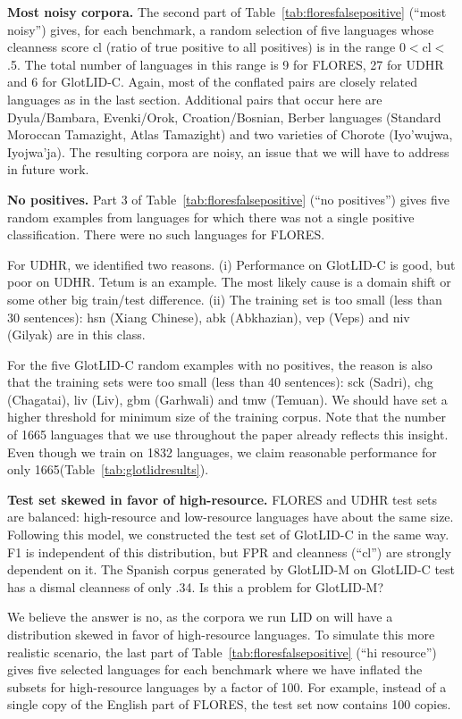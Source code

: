 \documentclass[11pt]{article}
\def\numberlanguagesaccurate{1665\xspace}
\def\numberlanguagestotal{1832\xspace}
\def\modelname{\mbox{GlotLID-M}\xspace}
\def\corpusname{\mbox{GlotLID-C}\xspace}
\def\flores{FLORES\xspace}
\def\udhr{UDHR\xspace}
\def\tabref#1{Table~\ref{tab:#1}}
\begin{document}
\textbf{Most noisy corpora.}
The second part of 
\tabref{floresfalsepositive} (``most noisy'') gives,
for each benchmark, a random selection of five languages
whose cleanness score cl (ratio of true positive to all
positives) is in the range 0$<$cl$<$.5. The total number of
languages in this range is 9 for \flores, 27 for \udhr and 6
for \corpusname. Again, most of the conflated pairs are
closely related languages as in the last section. Additional
pairs that occur here are Dyula/Bambara, Evenki/Orok,
Croation/Bosnian, Berber languages (Standard Moroccan
Tamazight,
Atlas
Tamazight) and two varieties of Chorote (Iyo'wujwa,
Iyojwa’ja). The resulting corpora are noisy,
an issue that we will have to address in future work.


\textbf{No positives.}
Part 3 of \tabref{floresfalsepositive} (``no positives'') gives five random examples from
languages for which there was not a single positive
classification. There were no such languages for \flores.


For \udhr, we identified two reasons. (i) Performance
on \corpusname is good, but poor on \udhr. Tetum is an
example.  The most likely cause is a domain shift or some
other big train/test difference.  (ii) The training set
is too small (less than 30 sentences): hsn (Xiang Chinese),
abk (Abkhazian), vep (Veps) and niv (Gilyak) are in this
class.

For the five \corpusname random examples with no positives,
the reason is also that the training sets
were too small (less than 40 sentences): sck (Sadri), chg
(Chagatai), liv (Liv), gbm (Garhwali) and tmw (Temuan). We should have set a higher threshold for
minimum size of the training corpus. Note that the number
of \numberlanguagesaccurate languages that we use throughout
the paper already reflects this insight. Even though we
train on
\numberlanguagestotal languages, we claim
reasonable performance for only
\numberlanguagesaccurate (\tabref{glotlidresults}).

\textbf{Test set skewed in favor
of high-resource.}
\flores and \udhr test sets are balanced: high-resource and
low-resource languages have about the same size. Following
this model, we constructed the test set of \corpusname
in the same way. F1 is independent of this distribution, but
FPR and cleanness (``cl'') are strongly dependent on it. The
Spanish corpus generated by \modelname on \corpusname test
has a dismal cleanness of only .34. Is this a problem
for \modelname?

We believe the answer is no, as the
corpora we run LID on will have a distribution skewed
in favor of high-resource languages.
To simulate this more realistic scenario,
the last part of \tabref{floresfalsepositive}
(``hi resource'')
gives five selected languages for each benchmark
where we have inflated the subsets for high-resource
languages by a factor of 100. For example, instead of a
single copy of the English part of \flores, the test set now
contains 100 copies.
\end{document}
